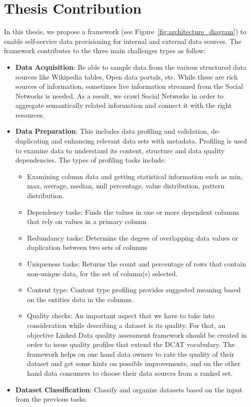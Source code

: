 \section{Thesis Contribution} \label{sec:contribution}

In this thesis, we propose a framework (see Figure~\ref{fig:architecture_diagram}) to enable self-service data provisioning for internal and external data sources. The framework contributes to the three main challenges types as follow:

 \begin{itemize}
 \item {\bf Data Acquisition}: Be able to sample data from the various structured data sources like Wikipedia tables, Open data portals, etc. While these are rich sources of information, sometimes live information streamed from the Social Networks is needed. As a result, we crawl Social Networks in order to aggregate semantically related information and connect it with the right resources.
 \item {\bf Data Preparation}: This includes data profiling and validation, de-duplicating and enhancing relevant data sets with metadata. Profiling is used to examine data to understand its content, structure and data quality dependencies. The types of profiling tasks include:
 \begin{itemize}
 \item Examining column data and getting statistical information such as min, max, average, median, null percentage, value distribution, pattern distribution.
 \item Dependency tasks: Finds the values in one or more dependent columns that rely on values in a primary column
 \item Redundancy tasks: Determine the degree of overlapping data values or duplication between two sets of columns
 \item Uniqueness tasks: Returns the count and percentage of rows that contain non-unique data, for the set of column(s) selected.
 \item Content type: Content type profiling provides suggested meaning based on the entities data in the columns.
 \item Quality checks: An important aspect that we have to take into consideration while describing a dataset is its quality. For that, an objective Linked Data quality assessment framework should be created in order to issue quality profiles that extend the DCAT vocabulary. The framework helps on one hand data owners to rate the quality of their dataset and get some hints on possible improvements, and on the other hand data consumers to choose their data sources from a ranked set.
 \end{itemize}
 \item {\bf Dataset Classification}: Classify and organize datasets based on the input from the previous tasks.
\end{itemize}

